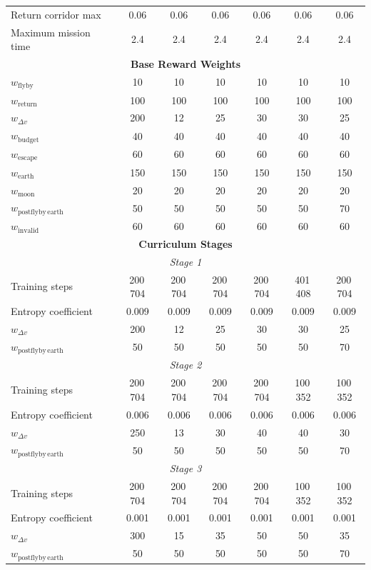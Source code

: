 \begin{table}[!t]
\begin{tabular*}{\textwidth}{@{\extracolsep{\fill}}lcccccc}
Return corridor max & 0.06 & 0.06 & 0.06 & 0.06 & 0.06 & 0.06\\
Maximum mission time & 2.4 & 2.4 & 2.4 & 2.4 & 2.4 & 2.4\\
\midrule
\multicolumn{7}{c}{\textbf{Base Reward Weights}}\\
\midrule
$w_{\mathrm{flyby}}$ & 10 & 10 & 10 & 10 & 10 & 10\\
$w_{\mathrm{return}}$ & 100 & 100 & 100 & 100 & 100 & 100\\
$w_{\Delta v}$ & 200 & 12 & 25 & 30 & 30 & 25\\
$w_{\mathrm{budget}}$ & 40 & 40 & 40 & 40 & 40 & 40\\
$w_{\mathrm{escape}}$ & 60 & 60 & 60 & 60 & 60 & 60\\
$w_{\mathrm{earth}}$ & 150 & 150 & 150 & 150 & 150 & 150\\
$w_{\mathrm{moon}}$ & 20 & 20 & 20 & 20 & 20 & 20\\
$w_{\mathrm{postflyby\,earth}}$ & 50 & 50 & 50 & 50 & 50 & 70\\
$w_{\mathrm{invalid}}$ & 60 & 60 & 60 & 60 & 60 & 60\\
\midrule
\multicolumn{7}{c}{\textbf{Curriculum Stages}}\\
\midrule
\multicolumn{7}{c}{\textit{Stage 1}}\\
\midrule
Training steps & 200\,704 & 200\,704 & 200\,704 & 200\,704 & 401\,408 & 200\,704\\
Entropy coefficient & 0.009 & 0.009 & 0.009 & 0.009 & 0.009 & 0.009\\
$w_{\Delta v}$ & 200 & 12 & 25 & 30 & 30 & 25\\
$w_{\mathrm{postflyby\,earth}}$ & 50 & 50 & 50 & 50 & 50 & 70\\
\midrule
\multicolumn{7}{c}{\textit{Stage 2}}\\
\midrule
Training steps & 200\,704 & 200\,704 & 200\,704 & 200\,704 & 100\,352 & 100\,352\\
Entropy coefficient & 0.006 & 0.006 & 0.006 & 0.006 & 0.006 & 0.006\\
$w_{\Delta v}$ & 250 & 13 & 30 & 40 & 40 & 30\\
$w_{\mathrm{postflyby\,earth}}$ & 50 & 50 & 50 & 50 & 50 & 70\\
\midrule
\multicolumn{7}{c}{\textit{Stage 3}}\\
\midrule
Training steps & 200\,704 & 200\,704 & 200\,704 & 200\,704 & 100\,352 & 100\,352\\
Entropy coefficient & 0.001 & 0.001 & 0.001 & 0.001 & 0.001 & 0.001\\
$w_{\Delta v}$ & 300 & 15 & 35 & 50 & 50 & 35\\
$w_{\mathrm{postflyby\,earth}}$ & 50 & 50 & 50 & 50 & 50 & 70\\
\bottomrule
\end{tabular*}
\end{table}
